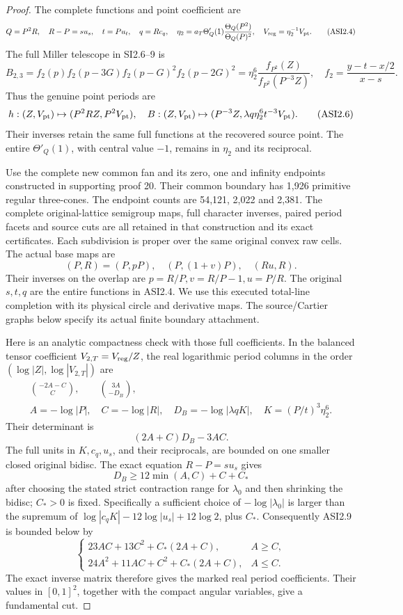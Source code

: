 \begin{proof}
The complete functions and point coefficient are
\[
 Q=P^2R,\quad R-P=su_s,\quad t=Pu_t,\quad q=Rc_q,\quad
 \eta_2=a_T\Theta'_Q(1)\frac{\Theta_Q(P^2)}{\Theta_Q(P)^2},
 \quad V_{\rm reg}=\eta_2^{-1}V_{\rm pt}.
 \tag{ASI2.4}
\]
The full Miller telescope in SI2.6--9 is
\[
 B_{2,3}=f_2(p)f_2(p-3G)f_2(p-G)^2f_2(p-2G)^2
 =\eta_2^6\frac{f_{P^2}(Z)}{f_{P^2}(P^{-3}Z)},\quad
 f_2=\frac{y-t-x/2}{x-s}.
 \tag{ASI2.5}
\]
Thus the genuine point periods are
\[
 h:(Z,V_{\rm pt})\mapsto(P^2RZ,P^2V_{\rm pt}),\quad
 B:(Z,V_{\rm pt})\mapsto
       (P^{-3}Z,\lambda q\eta_2^6t^{-3}V_{\rm pt}).
 \tag{ASI2.6}
\]
Their inverses retain the same full functions at the recovered
source point. The entire \(\Theta'_Q(1)\), with central value
\(-1\), remains in \(\eta_2\) and its reciprocal.

Use the complete new common fan and its zero, one and infinity
endpoints constructed in supporting proof 20.  Their common boundary
has 1,926 primitive regular three-cones.  The endpoint counts are
54,121, 2,022 and 2,381.  The complete original-lattice semigroup maps,
full character inverses, paired period facets and source cuts are all
retained in that construction and its exact certificates.  Each
subdivision is proper over the same original convex raw cells.
The actual base maps are
\[
       (P,R)=(P,pP),\quad(P,(1+v)P),\quad(Ru,R).
 \tag{ASI2.7}
\]
Their inverses on the overlap are \(p=R/P,v=R/P-1,u=P/R\).
The original \(s,t,q\) are the entire functions in ASI2.4.
We use this executed total-line completion with its physical
circle and derivative maps. The source/Cartier graphs below
specify its actual finite boundary attachment.

Here is an analytic compactness check with those full coefficients.
In the balanced tensor coefficient \(V_{2,T}=V_{\rm reg}/Z\),
the real logarithmic period columns in the order
\((\log|Z|,\log|V_{2,T}|)\) are
\[
 \begin{gathered}
 \binom{-2A-C}{C},\qquad\binom{3A}{-D_B},\\
 A=-\log|P|,\quad C=-\log|R|,\quad
 D_B=-\log|\lambda qK|,\quad K=(P/t)^3\eta_2^6 .
 \end{gathered}
 \tag{ASI2.8}
\]
Their determinant is
\[
                    (2A+C)D_B-3AC .
 \tag{ASI2.9}
\]
The full units in \(K,c_q,u_s\), and their reciprocals,
are bounded on one smaller closed original bidisc. The exact
equation \(R-P=su_s\) gives
\[
 D_B\geq12\min(A,C)+C+C_*
 \tag{ASI2.10}
\]
after choosing the stated strict contraction range for
\(\lambda_0\) and then shrinking the bidisc; \(C_*>0\) is
fixed. Specifically a sufficient choice of
\(-\log|\lambda_0|\) is larger than the supremum of
\(\log|c_qK|-12\log|u_s|+12\log2\), plus \(C_*\).
Consequently ASI2.9 is bounded below by
\[
 \begin{cases}
 23AC+13C^2+C_*(2A+C),&A\geq C,\\
 24A^2+11AC+C^2+C_*(2A+C),&A\leq C.
 \end{cases}
 \tag{ASI2.11}
\]
The exact inverse matrix therefore gives the marked real period
coefficients. Their values in \([0,1]^2\), together with the
compact angular variables, give a fundamental cut.


\end{proof}
